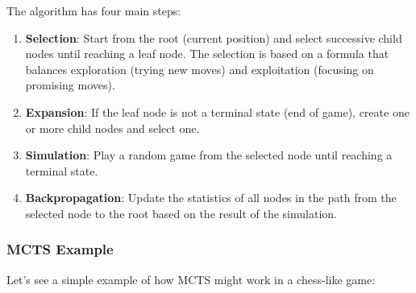 \documentclass[11pt]{article}
\begin{document}
The algorithm has four main steps:
\begin{enumerate}
    \item \textbf{Selection}: Start from the root (current position) and select successive child nodes until reaching a leaf node. The selection is based on a formula that balances exploration (trying new moves) and exploitation (focusing on promising moves).

    \item \textbf{Expansion}: If the leaf node is not a terminal state (end of game), create one or more child nodes and select one.

    \item \textbf{Simulation}: Play a random game from the selected node until reaching a terminal state.

    \item \textbf{Backpropagation}: Update the statistics of all nodes in the path from the selected node to the root based on the result of the simulation.
\end{enumerate}

\subsubsection{MCTS Example}

Let's see a simple example of how MCTS might work in a chess-like game:
\end{document}
